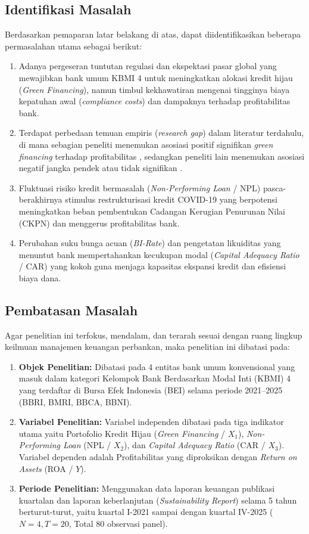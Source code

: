 \documentclass[12pt,a4paper]{article}
\numberwithin{equation}{section}
\begin{document}
\subsection{Identifikasi Masalah}

\noindent
Berdasarkan pemaparan latar belakang di atas, dapat diidentifikasikan beberapa permasalahan utama sebagai berikut:
\begin{enumerate}
  \item Adanya pergeseran tuntutan regulasi dan ekspektasi pasar global yang mewajibkan bank umum KBMI 4 untuk meningkatkan alokasi kredit hijau (\emph{Green Financing}), namun timbul kekhawatiran mengenai tingginya biaya kepatuhan awal (\emph{compliance costs}) dan dampaknya terhadap profitabilitas bank.
  \item Terdapat perbedaan temuan empiris (\emph{research gap}) dalam literatur terdahulu, di mana sebagian peneliti menemukan asosiasi positif signifikan \emph{green financing} terhadap profitabilitas \citep{Pramono2022, Yin2021, SariAstuti2023}, sedangkan peneliti lain menemukan asosiasi negatif jangka pendek atau tidak signifikan \citep{Akomea2022, Zhang2022}.
  \item Fluktuasi risiko kredit bermasalah (\emph{Non-Performing Loan} / NPL) pasca-berakhirnya stimulus restrukturisasi kredit COVID-19 yang berpotensi meningkatkan beban pembentukan Cadangan Kerugian Penurunan Nilai (CKPN) dan menggerus profitabilitas bank.
  \item Perubahan suku bunga acuan (\emph{BI-Rate}) dan pengetatan likuiditas yang menuntut bank mempertahankan kecukupan modal (\emph{Capital Adequacy Ratio} / CAR) yang kokoh guna menjaga kapasitas ekspansi kredit dan efisiensi biaya dana.
\end{enumerate}

\subsection{Pembatasan Masalah}

\noindent
Agar penelitian ini terfokus, mendalam, dan terarah sesuai dengan ruang lingkup keilmuan manajemen keuangan perbankan, maka penelitian ini dibatasi pada:
\begin{enumerate}
  \item \textbf{Objek Penelitian:} Dibatasi pada 4 entitas bank umum konvensional yang masuk dalam kategori Kelompok Bank Berdasarkan Modal Inti (KBMI) 4 yang terdaftar di Bursa Efek Indonesia (BEI) selama periode 2021--2025 (BBRI, BMRI, BBCA, BBNI).
  \item \textbf{Variabel Penelitian:} Variabel independen dibatasi pada tiga indikator utama yaitu Portofolio Kredit Hijau (\emph{Green Financing} / $X_1$), \emph{Non-Performing Loan} (NPL / $X_2$), dan \emph{Capital Adequacy Ratio} (CAR / $X_3$). Variabel dependen adalah Profitabilitas yang diproksikan dengan \emph{Return on Assets} (ROA / $Y$).
  \item \textbf{Periode Penelitian:} Menggunakan data laporan keuangan publikasi kuartalan dan laporan keberlanjutan (\emph{Sustainability Report}) selama 5 tahun berturut-turut, yaitu kuartal I-2021 sampai dengan kuartal IV-2025 ($N=4, T=20$, Total 80 observasi panel).
\end{enumerate}
\end{document}
